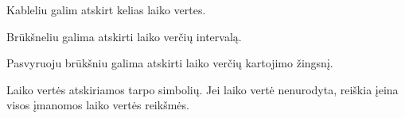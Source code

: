 \documentclass[letterpaper,10pt,lithuanian]{sphinxmanual}
\begin{document}
\begin{fulllineitems}
\begin{fulllineitems}
\begin{description}
\end{description}
\begin{description}
\sphinxlineitem{,}
\sphinxAtStartPar
Kableliu galim atskirt kelias laiko vertes.

\sphinxlineitem{\sphinxhyphen{}}
\sphinxAtStartPar
Brūkšneliu galima atskirti laiko verčių intervalą.

\end{description}
\begin{description}
\sphinxlineitem{/}
\sphinxAtStartPar
Pasvyruoju brūkšniu galima atskirti laiko verčių kartojimo
žingsnį.

\end{description}

\sphinxAtStartPar
Laiko vertės atskiriamos tarpo simbolių. Jei laiko vertė nenurodyta,
reiškia įeina visos įmanomos laiko vertės reikšmės.

\end{fulllineitems}


\begin{fulllineitems}
\label{\detokenize{formules:hourly}}
\pysigstartsignatures
\pysiglinewithargsret
{}
{}
{}
\pysigstopsignatures
\sphinxAtStartPar
{\hyperref[\detokenize{formules:cron}]{}}

\end{fulllineitems}


\begin{fulllineitems}
\label{\detokenize{formules:daily}}
\pysigstartsignatures
\pysiglinewithargsret
{}
{}
{}
\pysigstopsignatures
\sphinxAtStartPar
{\hyperref[\detokenize{formules:cron}]{}}

\end{fulllineitems}



\end{fulllineitems}
\end{document}
